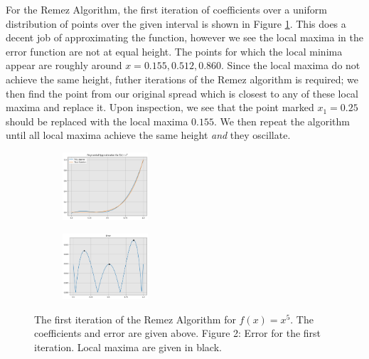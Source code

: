 \begin{solution}
      For the Remez Algorithm, the first iteration of coefficients over a uniform distribution of points over the given interval is shown in Figure \ref{fig:firstRemez15}. This does a decent job of approximating the function, however we see the local maxima in the error function are not at equal height. The points for which the local minima appear are roughly around $x = 0.155, 0.512, 0.860$. Since the local maxima do not achieve the same height, futher iterations of the Remez algorithm is required; we then find the point from our original spread which is closest to any of these local maxima and replace it. Upon inspection, we see that the point marked $x_1 = 0.25$ should be replaced with the local maxima $0.155$. We then repeat the algorithm until all local maxima achieve the same height \textit{and} they oscillate. 
\end{solution}
\vspace{1in}
\begin{figure}[!hb]
    \centering
    \begin{subfigure}
    \centering
        \includegraphics[width=0.35\textwidth]{Figures/FirstRemez15.png}     
    \end{subfigure}%
    \hspace{10mm}
    \begin{subfigure}
        \centering
        \includegraphics[width=0.35\textwidth]{Figures/Error15.png}    
    \end{subfigure}
    \caption{The first iteration of the Remez Algorithm for $f(x) = x^5$. The coefficients and error are given above. Figure 2: Error for the first iteration. Local maxima are given in black.}
    \label{fig:firstRemez15}
\end{figure}



